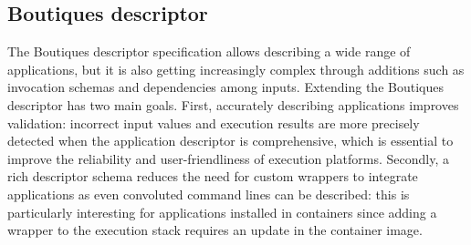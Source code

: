\documentclass{article}
\newcommand{\boutiques}{Boutiques\xspace}
\begin{document}
\subsection{\boutiques descriptor}

The \boutiques descriptor specification allows describing a wide range
of applications, but it is also getting increasingly complex through
additions such as invocation schemas and dependencies among
inputs. Extending the \boutiques descriptor has two main goals. First,
accurately describing applications improves validation: incorrect input
values and execution results are more precisely detected when the
application descriptor is comprehensive, which is essential to improve
the reliability and user-friendliness of execution
platforms. Secondly, a rich descriptor schema reduces the need for
custom wrappers to integrate applications as even convoluted command
lines can be described: this is particularly interesting for
applications installed in containers since adding a wrapper to the
execution stack requires an update in the container image.
\end{document}
